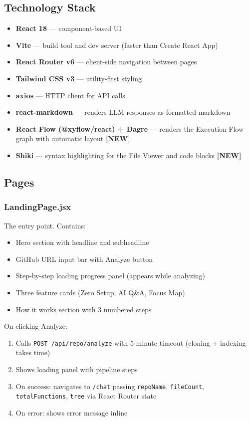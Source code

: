 \documentclass[a4paper,11pt]{article}
\begin{document}
\subsection{Technology Stack}
\begin{itemize}
    \item \textbf{React 18} --- component-based UI
    \item \textbf{Vite} --- build tool and dev server (faster than Create React App)
    \item \textbf{React Router v6} --- client-side navigation between pages
    \item \textbf{Tailwind CSS v3} --- utility-first styling
    \item \textbf{axios} --- HTTP client for API calls
    \item \textbf{react-markdown} --- renders LLM responses as formatted markdown
    \item \textbf{React Flow (@xyflow/react) + Dagre} --- renders the Execution Flow graph with automatic layout \textbf{[NEW]}
    \item \textbf{Shiki} --- syntax highlighting for the File Viewer and code blocks \textbf{[NEW]}
\end{itemize}

\subsection{Pages}

\subsubsection{LandingPage.jsx}
The entry point. Contains:
\begin{itemize}
    \item Hero section with headline and subheadline
    \item GitHub URL input bar with Analyze button
    \item Step-by-step loading progress panel (appears while analyzing)
    \item Three feature cards (Zero Setup, AI Q\&A, Focus Map)
    \item How it works section with 3 numbered steps
\end{itemize}

On clicking Analyze:
\begin{enumerate}
    \item Calls \texttt{POST /api/repo/analyze} with 5-minute timeout (cloning + indexing takes time)
    \item Shows loading panel with pipeline steps
    \item On success: navigates to \texttt{/chat} passing \texttt{repoName}, \texttt{fileCount}, \texttt{totalFunctions}, \texttt{tree} via React Router state
    \item On error: shows error message inline
\end{enumerate}
\end{document}
